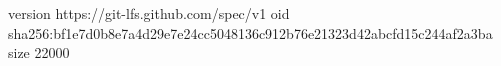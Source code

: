 version https://git-lfs.github.com/spec/v1
oid sha256:bf1e7d0b8e7a4d29e7e24cc5048136c912b76e21323d42abcfd15c244af2a3ba
size 22000
